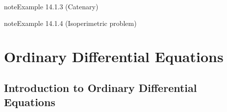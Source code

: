 \documentclass[letterpaper,10pt,english]{jupyterBook}
\begin{document}
\label{ch/calculus-variations/intro:example-2}
\begin{sphinxadmonition}{note}{Example 14.1.3 (Catenary)}


\end{sphinxadmonition}
\label{ch/calculus-variations/intro:example-3}
\begin{sphinxadmonition}{note}{Example 14.1.4 (Isoperimetric problem)}


\end{sphinxadmonition}

\sphinxstepscope


\part{Ordinary Differential Equations}

\sphinxstepscope


\chapter{Introduction to Ordinary Differential Equations}
\label{\detokenize{ch/ode/intro:introduction-to-ordinary-differential-equations}}\label{\detokenize{ch/ode/intro:ode}}\label{\detokenize{ch/ode/intro::doc}}
\sphinxstepscope
\end{document}
